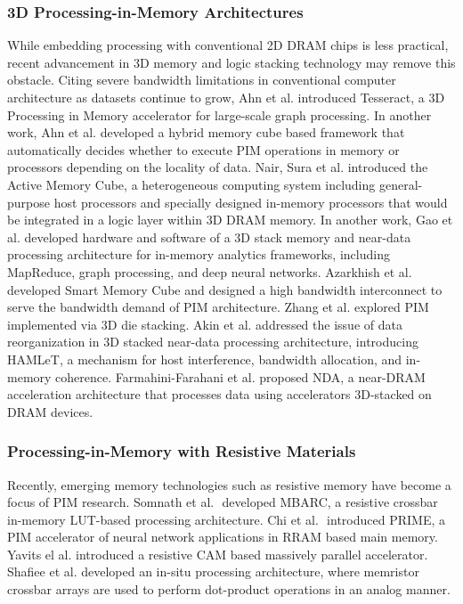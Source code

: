 \documentclass{superfri}
\begin{document}
\subsubsection{3D Processing-in-Memory Architectures}
\label{sec:3D_PiM}
While embedding processing with conventional 2D DRAM chips is less practical, recent advancement in 3D memory and logic stacking technology may remove this obstacle. Citing severe bandwidth limitations in conventional computer architecture as datasets continue to grow, Ahn et al. \cite{ahn2015scalable} introduced Tesseract, a 3D Processing in Memory accelerator for large-scale graph processing. In another work, Ahn et al. \cite{ahn2015pim} developed a hybrid memory cube based framework that automatically decides whether to execute PIM operations in memory or processors depending on the locality of data. Nair, Sura et al. \cite{sura2015data}\cite{nair2015active} introduced the Active Memory Cube, a heterogeneous computing system including general-purpose host processors and specially designed in-memory processors that would be integrated in a logic layer within 3D DRAM memory. In another work, Gao et al. \cite{gao2015practical} developed hardware and software of a 3D stack memory and near-data processing architecture for in-memory analytics frameworks, including MapReduce, graph processing, and deep neural networks. Azarkhish et al. \cite{azarkhish2017logic} developed Smart Memory Cube and designed a high bandwidth interconnect to serve the bandwidth demand of PIM architecture. Zhang et al. \cite{zhang2014top} explored PIM implemented via 3D die stacking. Akin et al. \cite{akin2016hamlet} addressed the issue of data reorganization in 3D stacked near-data processing architecture, introducing HAMLeT, a mechanism for host interference, bandwidth allocation, and in-memory coherence. Farmahini-Farahani et al. \cite{farmahini2015nda} proposed NDA, a near-DRAM acceleration architecture that processes data using accelerators 3D-stacked on DRAM devices.

\subsubsection{Processing-in-Memory with Resistive Materials}
\label{sec:Resistive_PiM}
Recently, emerging memory technologies such as resistive memory have become a focus of PIM research. Somnath et al. ‎\cite{paul2012scalable} developed MBARC, a resistive crossbar in-memory LUT-based processing architecture. Chi et al. ‎\cite{paul2012scalable} introduced PRIME, a PIM accelerator of neural network applications in RRAM based main memory. Yavits el al. \cite{yavits2015resistive} introduced a resistive CAM based massively parallel accelerator. Shafiee et al. \cite{shafiee2016isaac} developed an in-situ processing architecture, where memristor crossbar arrays are used to perform dot-product operations in an analog manner. 
\end{document}
